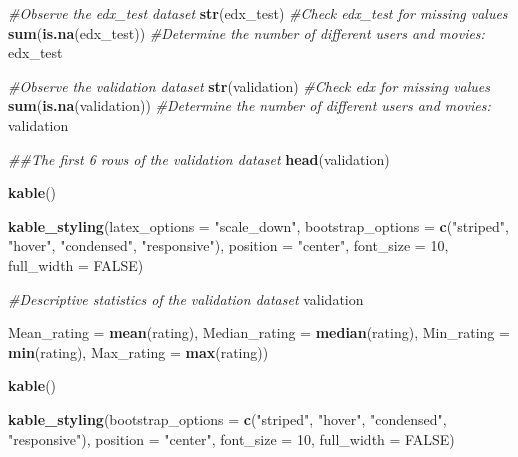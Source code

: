 \documentclass[
]{article}
\newenvironment{Shaded}{}{}
\newcommand{\CommentTok}[1]{\textcolor[rgb]{0.38,0.63,0.69}{\textit{#1}}}
\newcommand{\DataTypeTok}[1]{\textcolor[rgb]{0.56,0.13,0.00}{#1}}
\newcommand{\DecValTok}[1]{\textcolor[rgb]{0.25,0.63,0.44}{#1}}
\newcommand{\KeywordTok}[1]{\textcolor[rgb]{0.00,0.44,0.13}{\textbf{#1}}}
\newcommand{\NormalTok}[1]{#1}
\newcommand{\OperatorTok}[1]{\textcolor[rgb]{0.40,0.40,0.40}{#1}}
\newcommand{\OtherTok}[1]{\textcolor[rgb]{0.00,0.44,0.13}{#1}}
\newcommand{\StringTok}[1]{\textcolor[rgb]{0.25,0.44,0.63}{#1}}
\begin{document}
\begin{Shaded}
\begin{Highlighting}[]
{{{{{{{{{\CommentTok{#Observe the edx_test dataset}
\KeywordTok{str}\NormalTok{(edx_test)}
\CommentTok{#Check edx_test for missing values}
\KeywordTok{sum}\NormalTok{(}\KeywordTok{is.na}\NormalTok{(edx_test))}
\CommentTok{#Determine the number of different users and movies:}
\NormalTok{edx_test }\OperatorTok{%

\CommentTok{#Observe the validation dataset}
\KeywordTok{str}\NormalTok{(validation)}
\CommentTok{#Check edx for missing values}
\KeywordTok{sum}\NormalTok{(}\KeywordTok{is.na}\NormalTok{(validation))}
\CommentTok{#Determine the number of different users and movies:}
\NormalTok{validation }\OperatorTok{%

\CommentTok{##The first 6 rows of the validation dataset}
\KeywordTok{head}\NormalTok{(validation) }\OperatorTok{%
\StringTok{  }\KeywordTok{kable}\NormalTok{() }\OperatorTok{%
\StringTok{  }\KeywordTok{kable_styling}\NormalTok{(}\DataTypeTok{latex_options =} \StringTok{"scale_down"}\NormalTok{,}
                \DataTypeTok{bootstrap_options =} \KeywordTok{c}\NormalTok{(}\StringTok{"striped"}\NormalTok{, }\StringTok{"hover"}\NormalTok{, }\StringTok{"condensed"}\NormalTok{, }\StringTok{"responsive"}\NormalTok{),}
                \DataTypeTok{position =} \StringTok{"center"}\NormalTok{,}
                \DataTypeTok{font_size =} \DecValTok{10}\NormalTok{,}
                \DataTypeTok{full_width =} \OtherTok{FALSE}\NormalTok{)}

\CommentTok{#Descriptive statistics of the validation dataset}
\NormalTok{validation }\OperatorTok{%
                  \DataTypeTok{Mean_rating =} \KeywordTok{mean}\NormalTok{(rating), }\DataTypeTok{Median_rating =} \KeywordTok{median}\NormalTok{(rating),}
                  \DataTypeTok{Min_rating =} \KeywordTok{min}\NormalTok{(rating), }\DataTypeTok{Max_rating =} \KeywordTok{max}\NormalTok{(rating)) }\OperatorTok{%
\StringTok{  }\KeywordTok{kable}\NormalTok{() }\OperatorTok{%
\StringTok{  }\KeywordTok{kable_styling}\NormalTok{(}\DataTypeTok{bootstrap_options =} \KeywordTok{c}\NormalTok{(}\StringTok{"striped"}\NormalTok{, }\StringTok{"hover"}\NormalTok{, }\StringTok{"condensed"}\NormalTok{, }\StringTok{"responsive"}\NormalTok{),}
                \DataTypeTok{position =} \StringTok{"center"}\NormalTok{,}
                \DataTypeTok{font_size =} \DecValTok{10}\NormalTok{,}
                \DataTypeTok{full_width =} \OtherTok{FALSE}\NormalTok{)}


}}}}}}}}}}}}}}}}
\end{Highlighting}
\end{Shaded}
\end{document}
